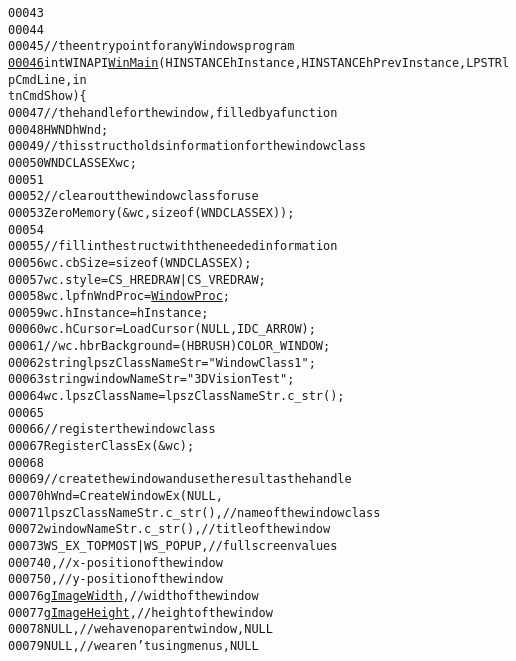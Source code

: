 \begin{footnotesize}
\begin{alltt}
00043 
00044 
00045 \textcolor{comment}{// the entry point for any Windows program}
\hypertarget{main_8cpp_source_l00046}{}\hyperlink{main_8cpp_a661c2abc03926acfaeb93b4ae7db4943}{00046} \textcolor{keywordtype}{int} WINAPI \hyperlink{main_8cpp_a661c2abc03926acfaeb93b4ae7db4943}{WinMain}(HINSTANCE hInstance,HINSTANCE hPrevInstance,LPSTR lpCmdLine,\textcolor{keywordtype}{in
      t} nCmdShow) \{
00047         \textcolor{comment}{// the handle for the window, filled by a function}
00048         HWND hWnd;
00049         \textcolor{comment}{// this struct holds information for the window class}
00050         WNDCLASSEX wc;
00051 
00052         \textcolor{comment}{// clear out the window class for use}
00053         ZeroMemory(&wc, \textcolor{keyword}{sizeof}(WNDCLASSEX));
00054 
00055         \textcolor{comment}{// fill in the struct with the needed information}
00056         wc.cbSize = \textcolor{keyword}{sizeof}(WNDCLASSEX);
00057         wc.style = CS\_HREDRAW | CS\_VREDRAW;
00058         wc.lpfnWndProc = \hyperlink{main_8cpp_a3481ed5b54326a7e5b2562195ee71a58}{WindowProc};
00059         wc.hInstance = hInstance;
00060         wc.hCursor = LoadCursor(NULL, IDC\_ARROW);
00061         \textcolor{comment}{// wc.hbrBackground = (HBRUSH)COLOR\_WINDOW;}
00062         \textcolor{keywordtype}{string} lpszClassNameStr = \textcolor{stringliteral}{"WindowClass1"};
00063         \textcolor{keywordtype}{string} windowNameStr = \textcolor{stringliteral}{"3DVision Test"};
00064         wc.lpszClassName = lpszClassNameStr.c\_str();
00065 
00066         \textcolor{comment}{// register the window class}
00067         RegisterClassEx(&wc);
00068 
00069         \textcolor{comment}{// create the window and use the result as the handle}
00070         hWnd = CreateWindowEx(NULL,
00071                 lpszClassNameStr.c\_str(),\textcolor{comment}{// name of the window class}
00072                 windowNameStr.c\_str(), \textcolor{comment}{// title of the window}
00073                 WS\_EX\_TOPMOST | WS\_POPUP,\textcolor{comment}{// fullscreen values}
00074                 0,\textcolor{comment}{// x-position of the window}
00075                 0,\textcolor{comment}{// y-position of the window}
00076                 \hyperlink{config_8h_a5dde88e08c88df4ec4c201ab068a909b}{gImageWidth},\textcolor{comment}{// width of the window}
00077                 \hyperlink{config_8h_af737c15e6577f2676602957bc1ac2ab1}{gImageHeight},\textcolor{comment}{// height of the window}
00078                 NULL,\textcolor{comment}{// we have no parent window, NULL}
00079                 NULL,\textcolor{comment}{// we aren't using menus, NULL}

\end{alltt}
\end{footnotesize}
